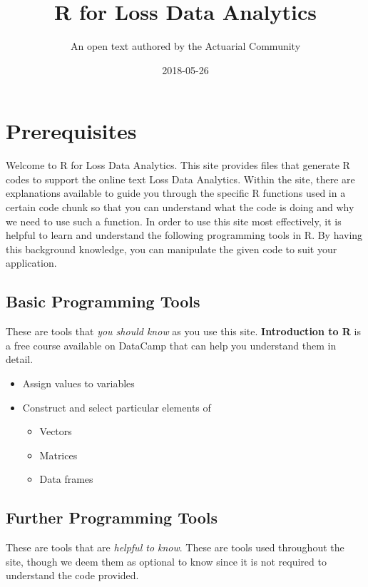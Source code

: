 \documentclass[]{book}
\title{R for Loss Data Analytics}
\author{An open text authored by the Actuarial Community}
\date{2018-05-26}
\providecommand{\tightlist}{%
  \setlength{\itemsep}{0pt}\setlength{\parskip}{0pt}}
\theoremstyle{definition}
\theoremstyle{definition}
\theoremstyle{definition}
\theoremstyle{remark}
\begin{document}
\maketitle

{
\setcounter{tocdepth}{1}
\tableofcontents
}
\chapter{Prerequisites}\label{prerequisites}

Welcome to R for Loss Data Analytics. This site provides files that
generate R codes to support the online text Loss Data Analytics. Within
the site, there are explanations available to guide you through the
specific R functions used in a certain code chunk so that you can
understand what the code is doing and why we need to use such a
function. In order to use this site most effectively, it is helpful to
learn and understand the following programming tools in R. By having
this background knowledge, you can manipulate the given code to suit
your application.

\section{Basic Programming Tools}\label{basic-programming-tools}

These are tools that \emph{you should know} as you use this site.
\textbf{Introduction to R} is a free course available on DataCamp that
can help you understand them in detail.

\begin{itemize}
\tightlist
\item
  Assign values to variables
\item
  Construct and select particular elements of

  \begin{itemize}
  \tightlist
  \item
    Vectors
  \item
    Matrices
  \item
    Data frames
  \end{itemize}
\end{itemize}

\section{Further Programming Tools}\label{further-programming-tools}

These are tools that are \emph{helpful to know}. These are tools used
throughout the site, though we deem them as optional to know since it is
not required to understand the code provided.
\end{document}
